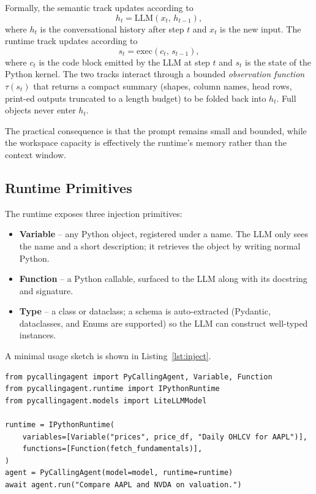 \documentclass[11pt,a4paper]{article}
\begin{document}
Formally, the semantic track updates according to
\begin{equation}
    h_t = \mathrm{LLM}(x_t,\, h_{t-1}),
\end{equation}
where $h_t$ is the conversational history after step $t$ and $x_t$ is the new input. The runtime track updates according to
\begin{equation}
    s_t = \mathrm{exec}(c_t,\, s_{t-1}),
\end{equation}
where $c_t$ is the code block emitted by the LLM at step $t$ and $s_t$ is the state of the Python kernel. The two tracks interact through a bounded \emph{observation function} $\tau(s_t)$ that returns a compact summary (shapes, column names, head rows, print-ed outputs truncated to a length budget) to be folded back into $h_t$. Full objects never enter $h_t$.

The practical consequence is that the prompt remains small and bounded, while the workspace capacity is effectively the runtime's memory rather than the context window.

\subsection{Runtime Primitives}

The runtime exposes three injection primitives:

\begin{itemize}[leftmargin=1.3em,itemsep=0.2em]
    \item \textbf{Variable} -- any Python object, registered under a name. The LLM only sees the name and a short description; it retrieves the object by writing normal Python.
    \item \textbf{Function} -- a Python callable, surfaced to the LLM along with its docstring and signature.
    \item \textbf{Type} -- a class or dataclass; a schema is auto-extracted (Pydantic, dataclasses, and Enums are supported) so the LLM can construct well-typed instances.
\end{itemize}

A minimal usage sketch is shown in Listing~\ref{lst:inject}.

\begin{lstlisting}[caption={Injecting a DataFrame and a function into the runtime.},label={lst:inject}]
from pycallingagent import PyCallingAgent, Variable, Function
from pycallingagent.runtime import IPythonRuntime
from pycallingagent.models import LiteLLMModel

runtime = IPythonRuntime(
    variables=[Variable("prices", price_df, "Daily OHLCV for AAPL")],
    functions=[Function(fetch_fundamentals)],
)
agent = PyCallingAgent(model=model, runtime=runtime)
await agent.run("Compare AAPL and NVDA on valuation.")
\end{lstlisting}
\end{document}
